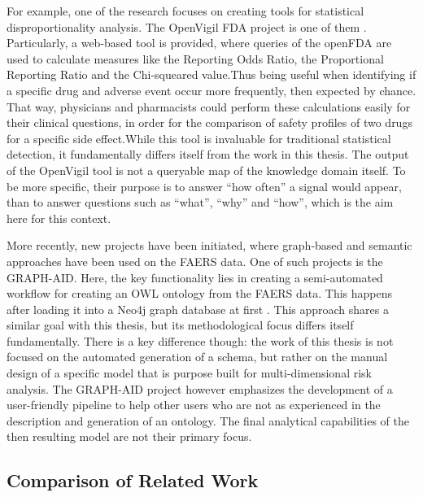 For example, one of the research focuses on creating tools for statistical disproportionality analysis. The OpenVigil FDA project is one of them \cite{Bohm2016openvigil}. Particularly, a  web-based tool is provided, where queries of the openFDA are used to calculate measures like the Reporting Odds Ratio, the Proportional Reporting Ratio and the Chi-squeared value.Thus being useful when identifying if a specific drug and adverse event occur more frequently, then expected by chance. That way, physicians and pharmacists could perform these calculations easily for their clinical questions, in order for the comparison of safety profiles of two drugs for a specific side effect.While this tool is invaluable for traditional statistical detection, it fundamentally differs itself from the work in this thesis. The output of the OpenVigil tool is not a queryable map of the knowledge domain itself. To be more specific, their purpose is to answer “how often” a signal would appear, than to answer questions such as “what”, “why” and “how”, which is the aim here for this context. 

More recently, new projects have been initiated, where graph-based and semantic approaches have been used on the FAERS data. One of such projects is the GRAPH-AID. Here, the key functionality lies in creating a semi-automated workflow for creating an OWL ontology from the FAERS data. This happens after loading it into a Neo4j graph database at first \cite{li2024neuralcorrelateslogicalmathematicalsymbol}. This approach shares a similar goal with this thesis, but its methodological focus differs itself fundamentally. There is a key difference though: the work of this thesis is not focused on the automated generation of a schema, but rather on the manual design of a specific model that is purpose built for multi-dimensional risk analysis. The GRAPH-AID project however emphasizes the development of a user-friendly pipeline to help other users who are not as experienced in the description and generation of an ontology. The final analytical capabilities of the then resulting model are not their primary focus. 
\subsection{Comparison of Related Work}

